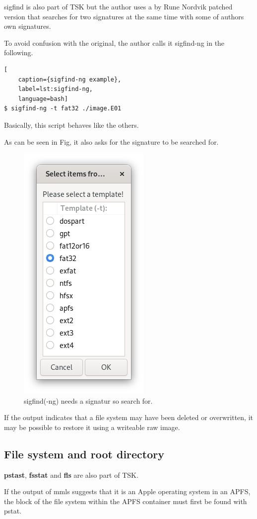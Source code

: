 sigfind is also part of TSK but the author uses a by Rune Nordvik patched version that searches for two signatures at the same time with some of authors own signatures.

To avoid confusion with the original, the author calls it sigfind-ng in the following.

\begin{lstlisting}[
    caption={sigfind-ng example},
    label=lst:sigfind-ng,
    language=bash]
$ sigfind-ng -t fat32 ./image.E01
\end{lstlisting}

Basically, this script behaves like the others.

As can be seen in Fig, it also asks for the signature to be searched for.

\begin{figure}[htbp]  %
  \centering
  \includegraphics[width=.25\textwidth]{figures/sigfind-ng.png}
  \caption[sigfind(-ng) signatures]{sigfind(-ng) needs a signatur so search for.}
  \label{fig:sigfind-ng}
\end{figure}

If the output indicates that a file system may have been deleted or overwritten, it may be possible to restore it using a writeable raw image.

\subsection{File system and root directory}

\textbf{pstast}, \textbf{fsstat} and \textbf{fls} are also part of TSK.

If the output of mmls suggests that it is an Apple operating system in an APFS, the block of the file system within the APFS container must first be found with pstat.

